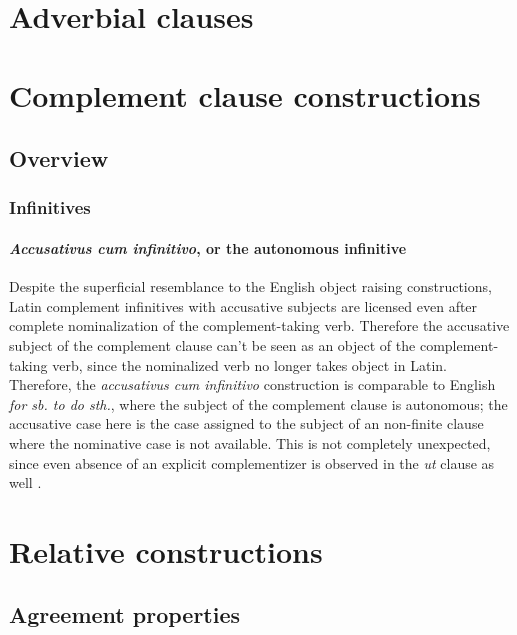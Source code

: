 \documentclass[a4paper, oneside, 12pt]{report}
\newcommand*{\citepages}[1]{pp.~{#1}}
\newcommand{\form}[1]{\emph{#1}}
\begin{document}
\chapter{Adverbial clauses}



\chapter{Complement clause constructions}\label{chap:complement-clause-construct}

\section{Overview}\label{sec:complement-clause-construct-overview}

\subsection{Infinitives}

\subsubsection{\form{Accusativus cum infinitivo}, or the autonomous infinitive}

Despite the superficial resemblance to the English object raising constructions,
Latin complement infinitives with accusative subjects 
are licensed even after complete nominalization
of the complement-taking verb.
Therefore the accusative subject of the complement clause 
can't be seen as an object of the complement-taking verb, 
since the nominalized verb no longer takes object in Latin.
Therefore, the \form{accusativus cum infinitivo} construction 
is comparable to English \form{for sb. to do sth.},
where the subject of the complement clause is autonomous;
the accusative case here is the case assigned to 
the subject of an non-finite clause where the nominative case is not available.
This is not completely unexpected, 
since even absence of an explicit complementizer 
is observed in the \form{ut} clause as well
\citep[\citepages{290-292}]{oniga2014latin}.

\chapter{Relative constructions}\label{chap:relative-clause}

\section{Agreement properties}\label{sec:relative-clause.overview.agreement}
\end{document}
